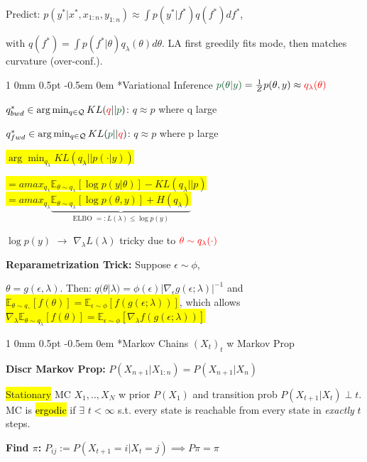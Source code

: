 \documentclass[11pt,landscape,a4paper,fleqn]{article}
\makeatletter
\newcommand*{\rsection}{%
	\@startsection{section}%
	{1}%
	{0mm}%
	{0.5pt}%
	{-0.5em \@plus 0em}
	{\color{myorange}\sffamily\small\bfseries}}
\newcommand{\mhl}[1]{\setlength{\fboxsep}{0pt}\colorbox{yellow}{#1}}
\makeatother
\begin{document}
\begin{multicols*}{4}
Predict: $p(y^*| x^*, x_{1:n}, y_{1:n}) \approx \int p(y^* | f^*) q(f^*) df^*$,

\vspace*{-1mm}
with $q(f^*) = \int p(f^* | \theta) q_\lambda(\theta) d\theta$.  LA first greedily fits mode, then matches curvature (over-conf.).

\rsection*{Variational Inference} {\fontsize{9.5}{6}\selectfont $\textcolor{darkgreen}{p(\theta | y)} = \frac{1}{Z} p(\theta, y) \approx \textcolor{red}{q_\lambda(\theta)}$}

$q_{bwd}^* \in \arg\min_{q \in \mathcal{Q}} KL(\textcolor{red}{q} || \textcolor{darkgreen}{p})$: $q \approx p$ where q large

$q_{fwd}^* \in \arg\min_{q \in \mathcal{Q}} KL(\textcolor{darkgreen}{p} || \textcolor{red}{q})$: $q \approx p$ where p large

\mhl{$\arg \min_{q_{\lambda}} KL(q_{\lambda}||p(\cdot|y))$}

\mhl{$= amax_{q_{\lambda}} \mathbb{E}_{\theta \sim q_\lambda}[\log p(y | \theta)] - KL(q_{\lambda}||p)$}
\mhl{$ = 	amax_{q_{\lambda}}
\underbrace{ \mathbb{E}_{\theta \sim q_{\lambda}}[\log p(\theta, y)] + H(q_{\lambda})
}_{
\text{ELBO }=:L(\lambda)\leq \log p(y)
}$}

$\log p(y)$ $\rightarrow$ $\nabla_\lambda L(\lambda)$ tricky due to $\textcolor{red}{\theta \sim q_\lambda(\cdot)}$


\textbf{Reparametrization Trick:} Suppose $\epsilon \sim \phi$, 

\vspace*{-1mm}
$\theta = g(\epsilon, \lambda)$. Then: $q(\theta | \lambda) = \phi(\epsilon) |\nabla_\epsilon g(\epsilon; \lambda)|^{-1}$ and \mhl{$\mathbb{E}_{\theta \sim q_\lambda}[f(\theta)] = \mathbb{E}_{\epsilon \sim \phi}[f(g(\epsilon; \lambda))]$}, which allows \mhl{$\nabla_\lambda \mathbb{E}_{\theta \sim q_\lambda}[f(\theta)] = \mathbb{E}_{\epsilon \sim \phi}[\nabla_\lambda f(g(\epsilon; \lambda))]$}

\rsection*{Markov Chains} $(X_t)_t$ w Markov Prop

\textbf{Discr Markov Prop:} $P(X_{n+1}|X_{1:n})=P(X_{n+1}|X_{n})$

\mhl{Stationary} MC $X_1,..,X_N$ w prior $P(X_1)$ and transition prob $P(X_{t+1} | X_t)\perp t$. MC is \hl{ergodic} if $\exists$ $t < \infty$ s.t. every state is reachable from every state in \textit{exactly} $t$ steps.

\textbf{Find $\pi$:} $P_{ij}:=P(X_{t+1}=i|X_t=j)\implies P\pi=\pi$


\end{multicols*}
\end{document}
